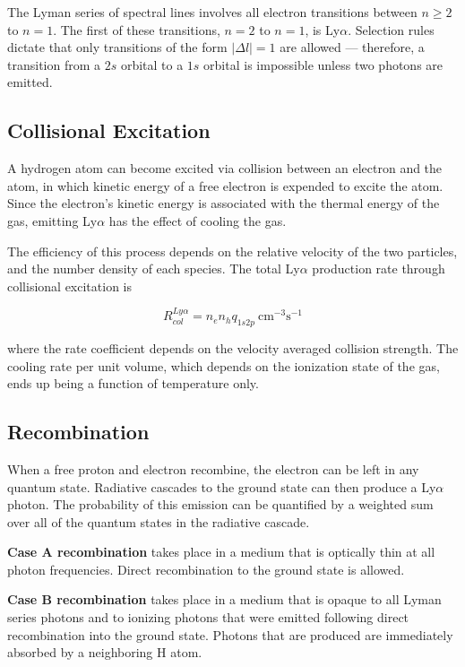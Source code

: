 \documentclass[onecolumn]{aastex63}
\begin{document}
The Lyman series of spectral lines involves all electron transitions between $n \ge 2$ to $n = 1$. The first of these transitions, $n = 2$ to $n = 1$, is Ly$\alpha$. Selection rules dictate that only transitions of the form $|\Delta l| = 1$ are allowed --- therefore, a transition from a $2s$ orbital to a $1s$ orbital is impossible unless two photons are emitted.

\subsection{Collisional Excitation} A hydrogen atom can become excited via collision between an electron and the atom, in which kinetic energy of a free electron is expended to excite the atom. Since the electron's kinetic energy is associated with the thermal energy of the gas, emitting Ly$\alpha$ has the effect of cooling the gas.

The efficiency of this process depends on the relative velocity of the two particles, and the number density of each species. The total Ly$\alpha$ production rate through collisional excitation is 

\begin{equation}
    R_{col}^{Ly\alpha} = n_e n_h q_{1s2p}\ \textrm{cm}^{-3} \textrm{s}^{-1}
\end{equation}

where the rate coefficient depends on the velocity averaged collision strength. The cooling rate per unit volume, which depends on the ionization state of the gas, ends up being a function of temperature only.

\subsection{Recombination} When a free proton and electron recombine, the electron can be left in any quantum state. Radiative cascades to the ground state can then produce a Ly$\alpha$ photon. The probability of this emission can be quantified by a weighted sum over all of the quantum states in the radiative cascade.

\textbf{Case A recombination} takes place in a medium that is optically thin at all photon frequencies. Direct recombination to the ground state is allowed.

\textbf{Case B recombination} takes place in a medium that is opaque to all Lyman series photons and to ionizing photons that were emitted following direct recombination into the ground state. Photons that are produced are immediately absorbed by a neighboring H atom.
\end{document}
